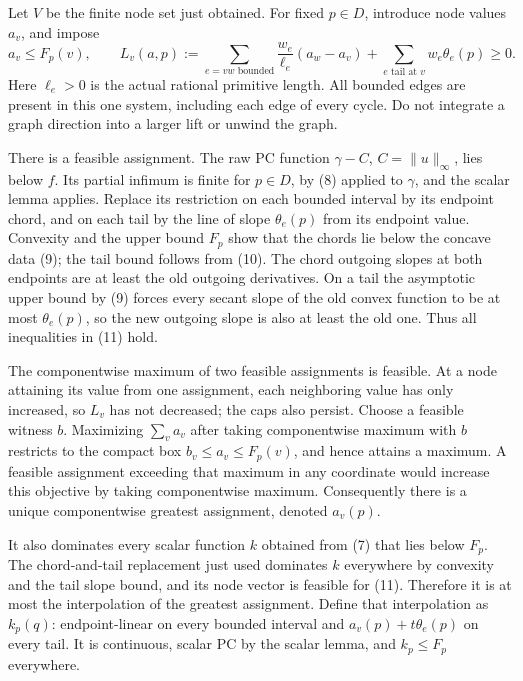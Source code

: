 \documentclass[
  11pt,
]{article}
\begin{document}
Let \(V\) be the finite node set just obtained. For fixed \(p\in D\),
introduce node values \(a_v\), and impose \[
 a_v\leq F_p(v),\qquad
 L_v(a,p):=\sum_{e=vw\text{ bounded}}\frac{w_e}{\ell_e}(a_w-a_v)
                +\sum_{e\text{ tail at }v}w_e\theta_e(p)\geq0.             \tag{11}
\] Here \(\ell_e>0\) is the actual rational primitive length. All
bounded edges are present in this one system, including each edge of
every cycle. Do not integrate a graph direction into a larger lift or
unwind the graph.

There is a feasible assignment. The raw PC function \(\gamma-C\),
\(C=\|u\|_\infty\), lies below \(f\). Its partial infimum is finite for
\(p\in D\), by (8) applied to \(\gamma\), and the scalar lemma applies.
Replace its restriction on each bounded interval by its endpoint chord,
and on each tail by the line of slope \(\theta_e(p)\) from its endpoint
value. Convexity and the upper bound \(F_p\) show that the chords lie
below the concave data (9); the tail bound follows from (10). The chord
outgoing slopes at both endpoints are at least the old outgoing
derivatives. On a tail the asymptotic upper bound by (9) forces every
secant slope of the old convex function to be at most \(\theta_e(p)\),
so the new outgoing slope is also at least the old one. Thus all
inequalities in (11) hold.

The componentwise maximum of two feasible assignments is feasible. At a
node attaining its value from one assignment, each neighboring value has
only increased, so \(L_v\) has not decreased; the caps also persist.
Choose a feasible witness \(b\). Maximizing \(\sum_v a_v\) after taking
componentwise maximum with \(b\) restricts to the compact box
\(b_v\leq a_v\leq F_p(v)\), and hence attains a maximum. A feasible
assignment exceeding that maximum in any coordinate would increase this
objective by taking componentwise maximum. Consequently there is a
unique componentwise greatest assignment, denoted \(a_v(p)\).

It also dominates every scalar function \(k\) obtained from (7) that
lies below \(F_p\). The chord-and-tail replacement just used dominates
\(k\) everywhere by convexity and the tail slope bound, and its node
vector is feasible for (11). Therefore it is at most the interpolation
of the greatest assignment. Define that interpolation as \(k_p(q)\):
endpoint-linear on every bounded interval and \(a_v(p)+t\theta_e(p)\) on
every tail. It is continuous, scalar PC by the scalar lemma, and
\(k_p\leq F_p\) everywhere.
\end{document}
